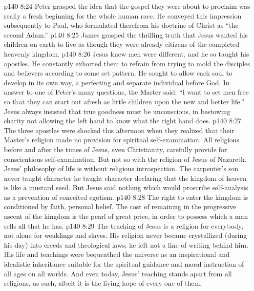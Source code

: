 \vs p140 8:24 Peter grasped the idea that the gospel they were about to proclaim was really a fresh beginning for the whole human race. He conveyed this impression subsequently to Paul, who formulated therefrom his doctrine of Christ as “the second Adam.”
\vs p140 8:25 James grasped the thrilling truth that Jesus wanted his children on earth to live as though they were already citizens of the completed heavenly kingdom.
\vs p140 8:26 \pc Jesus knew men were different, and he so taught his apostles. He constantly exhorted them to refrain from trying to mold the disciples and believers according to some set pattern. He sought to allow each soul to develop in its own way, a perfecting and separate individual before God. In answer to one of Peter’s many questions, the Master said: \textcolor{ubdarkred}{“I want to set men free so that they can start out afresh as little children upon the new and better life.”} Jesus always insisted that true goodness must be unconscious, in bestowing charity not allowing the left hand to know what the right hand does.
\vs p140 8:27 The three apostles were shocked this afternoon when they realized that their Master’s religion made no provision for spiritual self\hyp{}examination. All religions before and after the times of Jesus, even Christianity, carefully provide for conscientious self\hyp{}examination. But not so with the religion of Jesus of Nazareth. Jesus’ philosophy of life is without religious introspection. The carpenter’s son never taught character  he taught character  declaring that the kingdom of heaven is like a mustard seed. But Jesus said nothing which would proscribe self\hyp{}analysis as a prevention of conceited egotism.
\vs p140 8:28 The right to enter the kingdom is conditioned by faith, personal belief. The cost of remaining in the progressive ascent of the kingdom is the pearl of great price, in order to possess which a man sells all that he has.
\vs p140 8:29 The teaching of Jesus is a religion for everybody, not alone for weaklings and slaves. His religion never became crystallized (during his day) into creeds and theological laws; he left not a line of writing behind him. His life and teachings were bequeathed the universe as an inspirational and idealistic inheritance suitable for the spiritual guidance and moral instruction of all ages on all worlds. And even today, Jesus’ teaching stands apart from all religions, as such, albeit it is the living hope of every one of them.
